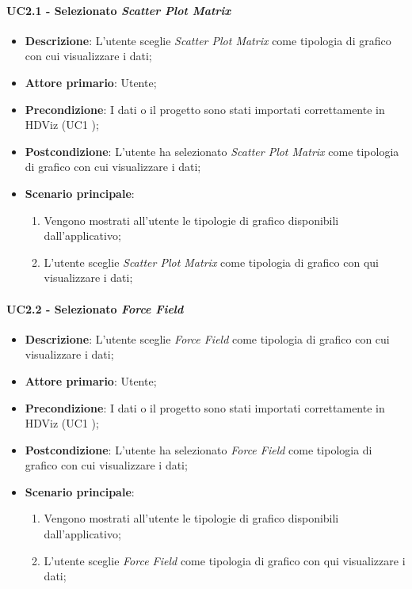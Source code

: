 \paragraph{UC2.1 - Selezionato \emph{Scatter Plot Matrix}}
\label{ssub:uc2.1}

\begin{itemize}
	\item \textbf{Descrizione}: L'utente sceglie \emph{Scatter Plot Matrix} come tipologia di grafico con cui visualizzare i dati;
	\item \textbf{Attore primario}: Utente;
	\item \textbf{Precondizione}: I dati o il progetto sono stati importati correttamente in HDViz (UC1 );
	\item \textbf{Postcondizione}: L'utente ha selezionato \emph{Scatter Plot Matrix} come tipologia di grafico con cui visualizzare i dati;
	\item \textbf{Scenario principale}:
		\begin{enumerate}
			\item Vengono mostrati all'utente le tipologie di grafico disponibili dall'applicativo;
			\item L'utente sceglie \emph{Scatter Plot Matrix} come tipologia di grafico con qui visualizzare i dati;
		\end{enumerate}
\end{itemize}

\paragraph{UC2.2 - Selezionato \emph{Force Field}}
\label{ssub:uc2.2}

\begin{itemize}
	\item \textbf{Descrizione}: L'utente sceglie \emph{Force Field} come tipologia di grafico con cui visualizzare i dati;
	\item \textbf{Attore primario}: Utente;
	\item \textbf{Precondizione}: I dati o il progetto sono stati importati correttamente in HDViz (UC1 );
	\item \textbf{Postcondizione}: L'utente ha selezionato \emph{Force Field} come tipologia di grafico con cui visualizzare i dati;
	\item \textbf{Scenario principale}:
		\begin{enumerate}
			\item Vengono mostrati all'utente le tipologie di grafico disponibili dall'applicativo;
			\item L'utente sceglie \emph{Force Field} come tipologia di grafico con qui visualizzare i dati;
		\end{enumerate}
\end{itemize}



